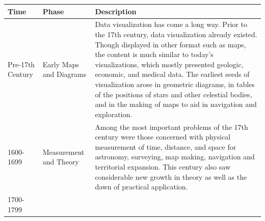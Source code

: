 \documentclass[]{book}
\theoremstyle{definition}
\theoremstyle{definition}
\theoremstyle{definition}
\theoremstyle{remark}
\begin{document}
\begin{longtable}[]{@{}lll@{}}
\toprule
\begin{minipage}[b]{0.07\columnwidth}\raggedright\strut
\textbf{Time}\strut
\end{minipage} & \begin{minipage}[b]{0.08\columnwidth}\raggedright\strut
\textbf{Phase}\strut
\end{minipage} & \begin{minipage}[b]{0.76\columnwidth}\raggedright\strut
\textbf{Description}\strut
\end{minipage}\tabularnewline
\midrule
\endhead
\begin{minipage}[t]{0.07\columnwidth}\raggedright\strut
Pre-17th Century\strut
\end{minipage} & \begin{minipage}[t]{0.08\columnwidth}\raggedright\strut
Early Maps and Diagrams\strut
\end{minipage} & \begin{minipage}[t]{0.76\columnwidth}\raggedright\strut
Data visualization has come a long way. Prior to the 17th century, data
visualization already existed. Though displayed in other format such as
maps, the content is much similar to today's visualizations, which
mostly presented geologic, economic, and medical data. The earliest
seeds of visualization arose in geometric diagrams, in tables of the
positions of stars and other celestial bodies, and in the making of maps
to aid in navigation and exploration.\strut
\end{minipage}\tabularnewline
\begin{minipage}[t]{0.07\columnwidth}\raggedright\strut
1600-1699\strut
\end{minipage} & \begin{minipage}[t]{0.08\columnwidth}\raggedright\strut
Measurement and Theory\strut
\end{minipage} & \begin{minipage}[t]{0.76\columnwidth}\raggedright\strut
Among the most important problems of the 17th century were those
concerned with physical measurement of time, distance, and space for
astronomy, surveying, map making, navigation and territorial expansion.
This century also saw considerable new growth in theory as well as the
dawn of practical application.\strut
\end{minipage}\tabularnewline
\begin{minipage}[t]{0.07\columnwidth}\raggedright\strut
1700-1799\strut
\end{minipage} & \begin{minipage}[t]{0.08\columnwidth}\raggedright\strut

\end{minipage}
\end{longtable}
\end{document}
